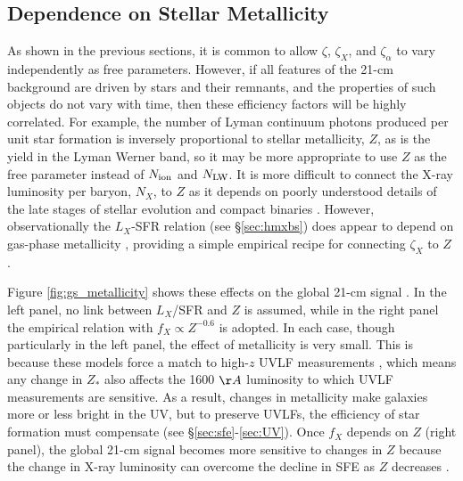 \subsection{Dependence on Stellar Metallicity}
As shown in the previous sections, it is common to allow $\zeta$, $\zeta_X$, and $\zeta_{\alpha}$ to vary independently as free parameters. However, if all features of the 21-cm background are driven by stars and their remnants, and the properties of such objects do not vary with time, then these efficiency factors will be highly correlated. For example, the number of Lyman continuum photons produced per unit star formation is inversely proportional to stellar metallicity, $Z$, as is the yield in the Lyman Werner band, so it may be more appropriate to use $Z$ as the free parameter instead of $N_{\text{ion}}$ and $N_{\text{LW}}$. It is more difficult to connect the X-ray luminosity per baryon, $N_X$, to $Z$ as it depends on poorly understood details of the late stages of stellar evolution and compact binaries \cite{Belczynski2002}. However, observationally the $L_X$-SFR relation (see \S\ref{sec:hmxbs}) does appear to depend on gas-phase metallicity \cite{Brorby2016}, providing a simple empirical recipe for connecting $\zeta_X$ to $Z$ \cite{Mirocha2017}.

Figure \ref{fig:gs_metallicity} shows these effects on the global 21-cm signal \cite{Mirocha2017}. In the left panel, no link between $L_X$/SFR and $Z$ is assumed, while in the right panel the empirical relation with $f_X \propto Z^{-0.6}$ is adopted. In each case, though particularly in the left panel, the effect of metallicity is very small. This is because these models force a match to high-$z$ UVLF measurements \cite{Bouwens2015,Finkelstein2015}, which means any change in $Z_{\ast}$ also affects the 1600 $\AA$ luminosity to which UVLF measurements are sensitive. As a result, changes in metallicity make galaxies more or less bright in the UV, but to preserve UVLFs, the efficiency of star formation must compensate (see \S\ref{sec:sfe}-\ref{sec:UV}). Once $f_X$ depends on $Z$ (right panel), the global 21-cm signal becomes more sensitive to changes in $Z$ because the change in X-ray luminosity can overcome the decline in SFE as $Z$ decreases \cite{Mirocha2017}.

